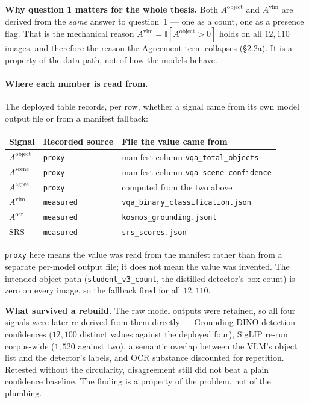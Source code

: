 \documentclass[11pt,a4paper]{article}
\newcommand{\notebox}[2]{%
  \par\medskip\noindent
  \colorbox{#1!12}{%
    \begin{minipage}{0.965\linewidth}
    \vspace{2pt}#2\vspace{4pt}
    \end{minipage}%
  }\par\medskip
}
\begin{document}
\notebox{WarnInk}{\textbf{Why question 1 matters for the whole thesis.} Both $A^{\text{object}}$ and $A^{\text{vlm}}$ are derived from the \emph{same} answer to question~1 --- one as a count, one as a presence flag. That is the mechanical reason $A^{\text{vlm}}=\mathbb{I}[A^{\text{object}}>0]$ holds on all $12{,}110$ images, and therefore the reason the Agreement term collapses (\S2.2a). It is a property of the data path, not of how the models behave.}

\paragraph{Where each number is read from.} The deployed table records, per row, whether a signal
came from its own model output file or from a manifest fallback:
\begin{center}\small
\begin{tabular}{@{}l l l@{}}
\toprule
\textbf{Signal} & \textbf{Recorded source} & \textbf{File the value came from} \\
\midrule
$A^{\text{object}}$ & \texttt{proxy} & manifest column \texttt{vqa\_total\_objects} \\
$A^{\text{scene}}$  & \texttt{proxy} & manifest column \texttt{vqa\_scene\_confidence} \\
$A^{\text{agree}}$  & \texttt{proxy} & computed from the two above \\
$A^{\text{vlm}}$    & \texttt{measured} & \texttt{vqa\_binary\_classification.json} \\
$A^{\text{ocr}}$    & \texttt{measured} & \texttt{kosmos\_grounding.jsonl} \\
$\text{SRS}$        & \texttt{measured} & \texttt{srs\_scores.json} \\
\bottomrule
\end{tabular}
\end{center}
\texttt{proxy} here means the value was read from the manifest rather than from a separate
per-model output file; it does not mean the value was invented. The intended object path
(\texttt{student\_v3\_count}, the distilled detector's box count) is zero on every image, so the
fallback fired for all $12{,}110$.

\notebox{GoodInk}{\textbf{What survived a rebuild.} The raw model outputs were retained, so all four signals were later re-derived from them directly --- Grounding DINO detection confidences ($12{,}100$ distinct values against the deployed four), SigLIP re-run corpus-wide ($1{,}520$ against two), a semantic overlap between the VLM's object list and the detector's labels, and OCR substance discounted for repetition. Retested without the circularity, disagreement still did not beat a plain confidence baseline. The finding is a property of the problem, not of the plumbing.}
\end{document}
